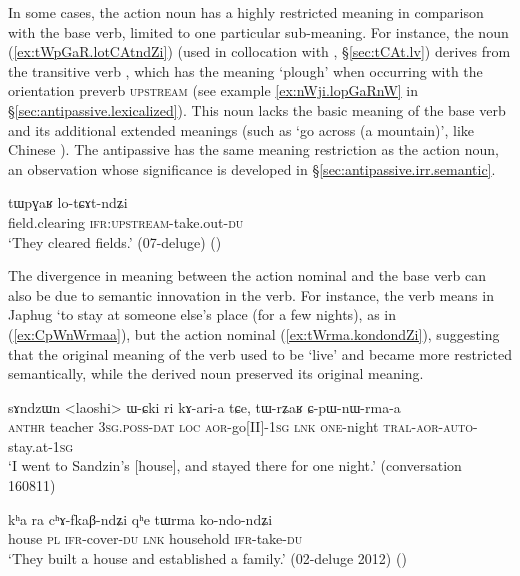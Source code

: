 In some cases, the action noun has a highly restricted meaning in comparison with the base verb, limited to one particular sub-meaning. For instance, the noun  (\ref{ex:tWpGaR.lotCAtndZi}) (used in collocation with , §\ref{sec:tCAt.lv}) derives from the transitive verb , which has the meaning `plough' when occurring with the orientation preverb \textsc{upstream} (see example \ref{ex:nWji.lopGaRnW} in §\ref{sec:antipassive.lexicalized}). This noun lacks the basic meaning of the base verb and its additional extended meanings (such as `go across (a mountain)', like Chinese ). The antipassive  has the same meaning restriction as the action noun, an observation whose significance is developed in §\ref{sec:antipassive.irr.semantic}.

\begin{exe}
\ex \label{ex:tWpGaR.lotCAtndZi}
\gll tɯpɣaʁ lo-tɕɤt-ndʑi \\
field.clearing \textsc{ifr}:\textsc{upstream}-take.out-\textsc{du} \\
\glt `They cleared fields.' (07-deluge) ()
\end{exe} 

The divergence in meaning between the action nominal and the base verb can also be due to semantic innovation in the verb. For instance, the verb  means in Japhug `to stay at someone else's place (for a few nights), as in (\ref{ex:CpWnWrmaa}), but the action nominal  (\ref{ex:tWrma.kondondZi}), suggesting that the original meaning of the verb used to be `live' and became more restricted semantically, while the derived noun preserved its original meaning.

\begin{exe}
\ex \label{ex:CpWnWrmaa}
\gll sɤndzɯn <laoshi> ɯ-ɕki ri kɤ-ari-a tɕe, tɯ-rʑaʁ ɕ-pɯ-nɯ-rma-a \\
\textsc{anthr} teacher \textsc{3sg}.\textsc{poss}-\textsc{dat} \textsc{loc} \textsc{aor}-go[II]-\textsc{1sg} \textsc{lnk} \textsc{one}-night \textsc{tral}-\textsc{aor}-\textsc{auto}-stay.at-\textsc{1sg} \\
\glt `I went to Sandzin's [house], and stayed there for one night.' (conversation 160811)
\end{exe}

\begin{exe}
\ex \label{ex:tWrma.kondondZi}
\gll kʰa ra cʰɤ-fkaβ-ndʑi qʰe tɯrma ko-ndo-ndʑi \\
house \textsc{pl} \textsc{ifr}-cover-\textsc{du} \textsc{lnk} household \textsc{ifr}-take-\textsc{du} \\
\glt `They built a house and established a family.' (02-deluge 2012)
()
\end{exe}


